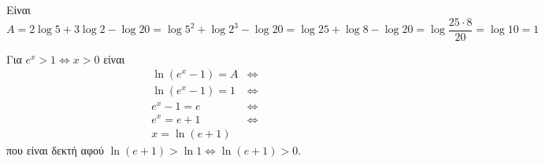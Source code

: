 \begin{alist}
\item Είναι
\[A = 2\log 5 + 3\log 2 - \log 20 = \log 5^2 + \log 2^3 - \log 20 = \log 25 + \log 8 - \log 20 = \log\frac{25 \cdot 8}{20} = \log 10 = 1\]
\item Για $e^x > 1 \Leftrightarrow x > 0$ είναι
\begin{align*}
\ln(e^x - 1) = A &\Leftrightarrow \\
\ln(e^x - 1) = 1 &\Leftrightarrow \\
e^x - 1 = e &\Leftrightarrow \\
e^x = e + 1 &\Leftrightarrow \\
x = \ln(e + 1)
\end{align*}
που είναι δεκτή αφού $\ln(e + 1) > \ln 1 \Leftrightarrow \ln(e + 1) > 0$.
\end{alist}

